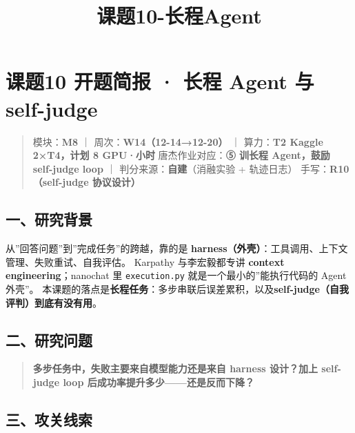 \documentclass[
  chinese,
  11pt,
]{ctexart}
\title{课题10-长程Agent}
\author{}
\date{}
\begin{document}
\maketitle

{
\setcounter{tocdepth}{2}
\tableofcontents
}
\section{课题10 开题简报 · 长程 Agent 与 self-judge}\label{ux8bfeux989810-ux5f00ux9898ux7b80ux62a5-ux957fux7a0b-agent-ux4e0e-self-judge}

\begin{quote}
模块：\textbf{M8} ｜ 周次：\textbf{W14（12-14→12-20）} ｜ 算力：\textbf{T2 Kaggle 2×T4，计划 8 GPU·小时} 唐杰作业对应：\textbf{⑤ 训长程 Agent，鼓励 self-judge loop} ｜ 判分来源：\textbf{自建}（消融实验 + 轨迹日志） 手写：\textbf{R10（self-judge 协议设计）}
\end{quote}

\subsection{一、研究背景}\label{ux4e00ux7814ux7a76ux80ccux666f}

从''回答问题''到''完成任务''的跨越，靠的是 \textbf{harness（外壳）}：工具调用、上下文管理、失败重试、自我评估。 Karpathy 与李宏毅都专讲 \textbf{context engineering}；nanochat 里 \texttt{execution.py} 就是一个最小的''能执行代码的 Agent 外壳''。 本课题的落点是\textbf{长程任务}：多步串联后误差累积，以及\textbf{self-judge（自我评判）到底有没有用}。

\subsection{二、研究问题}\label{ux4e8cux7814ux7a76ux95eeux9898}

\begin{quote}
\textbf{多步任务中，失败主要来自模型能力还是来自 harness 设计？加上 self-judge loop 后成功率提升多少------还是反而下降？}
\end{quote}

\subsection{三、攻关线索}\label{ux4e09ux653bux5173ux7ebfux7d22}
\end{document}
